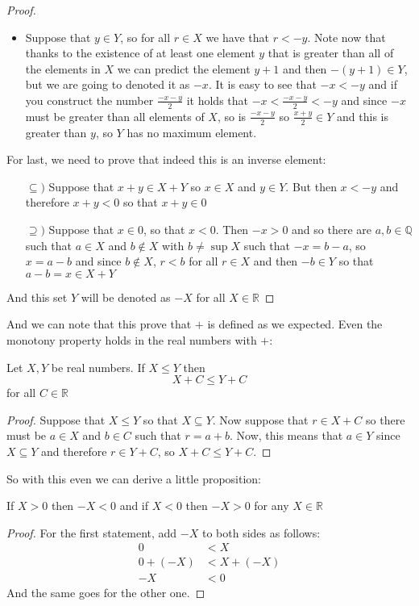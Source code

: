 \documentclass{tufte-handout}
\begin{document}
\begin{proof}
\begin{itemize}
		\item Suppose that $y \in Y$, so for all $r \in X$ we have that $r < -y$. Note now that thanks to the existence of at least one element $y$ that is greater than all of the elements in $X$ we can predict the element $y + 1$ and then $- (y + 1) \in Y$, but we are going to denoted it as $-x$. It is easy to see that $-x < -y$ and if you construct the number $\frac{-x-y}{2}$ it holds that $-x < \frac{-x-y}{2} < -y$ and since $-x$ must be greater than all elements of $X$, so is $\frac{-x-y}{2}$ so $\frac{x+y}{2} \in Y$ and this is greater than $y$, so $Y$ has no maximum element. 
	\end{itemize}

	For last, we need to prove that indeed this is an inverse element:
	\begin{itemize}
		\item[$\subseteq)$] Suppose that $x + y \in X + Y$ so $x \in X$ and $y \in Y$. But then $x < -y$ and therefore $x + y < 0$ so that $x + y \in 0$
		\item[$\supseteq)$] Suppose that $x \in 0$, so that $x < 0$. Then $-x > 0$ and so there are $a, b \in \mathbb{Q}$ such that $a \in X$ and $b \not\in X$ with $b \neq \sup X$ such that $-x = b - a$, so $x = a - b$ and since $b \not \in X$, $r < b$ for all $r \in X$ and then $-b \in Y$ so that $a - b = x \in X + Y$ 
	\end{itemize}
	And this set $Y$ will be denoted as $-X$ for all $X \in \mathbb{R}$
\end{proof}

And we can note that this prove that $+$ is defined as we expected. Even the monotony property holds in the real numbers with $+$:
\begin{theorem}
	Let $X, Y$ be real numbers. If $X \le Y$ then $$X + C \le Y + C$$ for all $C \in \mathbb{R}$
\end{theorem}
\begin{proof}
	Suppose that $X \le Y$ so that $X \subseteq Y$. Now suppose that $r \in X + C$ so there must be $a \in X$ and $b \in C$ such that $r = a + b$. Now, this means that $a \in Y$ since $X \subseteq Y$ and therefore $r \in Y + C$, so $X + C \le Y + C$.
\end{proof}

So with this even we can derive a little proposition:
\begin{corollary}
	If $X > 0$ then $-X < 0$ and if $X < 0$ then $-X > 0$ for any $X \in \mathbb{R}$
\end{corollary}
\begin{proof}
	For the first statement, add $-X$ to both sides as follows:
	\begin{align*}
		0 &< X\\
		0 + (-X) &< X + (-X)\\
		-X &< 0
	\end{align*}
	And the same goes for the other one.
\end{proof}
\end{document}

